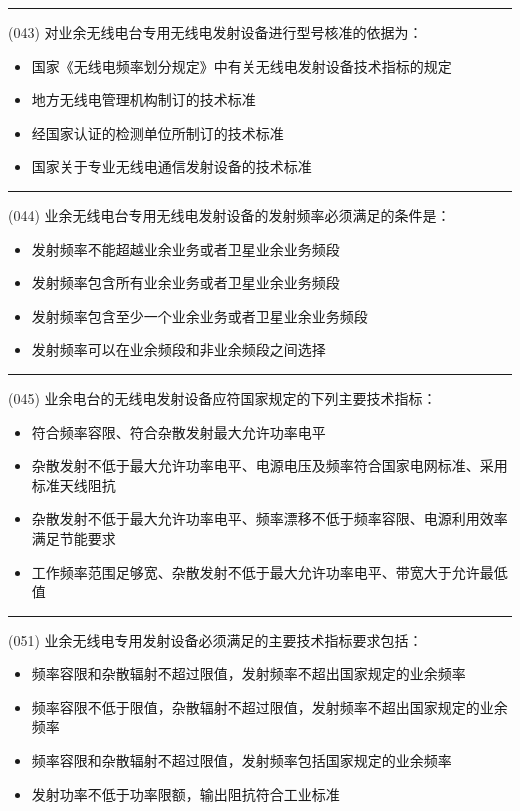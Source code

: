 \documentclass[twocolumn,hyperref,UTF8]{ctexart}  %
\begin{document}
\noindent\rule{0.5\textwidth}{1pt}
\heiti (043) 对业余无线电台专用无线电发射设备进行型号核准的依据为： \songti {\color{gray} [LK0039] }
\begin{itemize}
	\item  国家《无线电频率划分规定》中有关无线电发射设备技术指标的规定
	\item  地方无线电管理机构制订的技术标准
	\item  经国家认证的检测单位所制订的技术标准
	\item  国家关于专业无线电通信发射设备的技术标准
\end{itemize}


\noindent\rule{0.5\textwidth}{1pt}
\heiti (044) 业余无线电台专用无线电发射设备的发射频率必须满足的条件是： \songti {\color{gray} [LK0040] }
\begin{itemize}
	\item  发射频率不能超越业余业务或者卫星业余业务频段
	\item  发射频率包含所有业余业务或者卫星业余业务频段
	\item  发射频率包含至少一个业余业务或者卫星业余业务频段
	\item  发射频率可以在业余频段和非业余频段之间选择
\end{itemize}


\noindent\rule{0.5\textwidth}{1pt}
\heiti (045) 业余电台的无线电发射设备应符国家规定的下列主要技术指标： \songti {\color{gray} [LK0116] }
\begin{itemize}
	\item  符合频率容限、符合杂散发射最大允许功率电平
	\item  杂散发射不低于最大允许功率电平、电源电压及频率符合国家电网标准、采用标准天线阻抗
	\item  杂散发射不低于最大允许功率电平、频率漂移不低于频率容限、电源利用效率满足节能要求
	\item  工作频率范围足够宽、杂散发射不低于最大允许功率电平、带宽大于允许最低值
\end{itemize}





\noindent\rule{0.5\textwidth}{1pt}
\heiti (051) 业余无线电专用发射设备必须满足的主要技术指标要求包括： \songti {\color{gray} [LK0139] }
\begin{itemize}
	\item  频率容限和杂散辐射不超过限值，发射频率不超出国家规定的业余频率
	\item  频率容限不低于限值，杂散辐射不超过限值，发射频率不超出国家规定的业余频率
	\item  频率容限和杂散辐射不超过限值，发射频率包括国家规定的业余频率
	\item  发射功率不低于功率限额，输出阻抗符合工业标准
\end{itemize}
\end{document}
